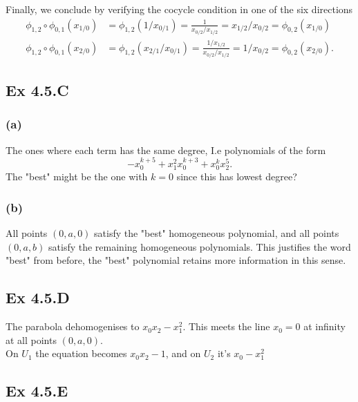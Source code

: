 \documentclass{article}
\theoremstyle{definition}
\begin{document}
Finally, we conclude by verifying the cocycle condition in one of the six
directions
\begin{align*}
	\phi_{1,2} \circ \phi_{0,1}(x_{1/0})
	&=
	\phi_{1,2}(1/x_{0/1})
	=
	\frac{1}{x_{0/2}/x_{1/2}}
	=
	x_{1/2}/x_{0/2}
	=
	\phi_{0, 2}(x_{1/0}) \\
	\phi_{1,2} \circ \phi_{0,1}(x_{2/0})
	&=
	\phi_{1,2}(x_{2/1}/x_{0/1})
	=
	\frac{1/x_{1/2}}{x_{0/2}/x_{1/2}}
	=
	1/x_{0/2}
	=
	\phi_{0,2}(x_{2/0}).
\end{align*}

\subsection*{Ex 4.5.C}
\subsubsection*{(a)}

The ones where each term has the same degree, I.e polynomials of the form 
\[
	-x_0^{k + 5} + x_1^{2}x_0^{k + 3} + x_0^{k}x_2^{5}.
\] 
The "best" might be the one with $k = 0$ since this has lowest degree?

\subsubsection*{(b)}

All points $(0, a, 0)$ satisfy the "best" homogeneous polynomial, and all
points $(0, a, b)$ satisfy the remaining homogeneous polynomials. This
justifies the word "best" from before, the "best" polynomial retains more
information in this sense.


\subsection*{Ex 4.5.D}

The parabola dehomogenises to $x_0x_2 - x_1^2$. This meets the 
line $x_0 = 0$ at infinity at all points $(0, a, 0)$. \\

On $U_1$ the equation becomes $x_0x_2 - 1$, and on $U_2$ it's $x_0 - x_1^2$

\subsection*{Ex 4.5.E}
\end{document}
